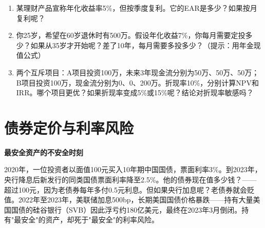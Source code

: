 \documentclass[a4paper,11pt]{ctexbook}
\begin{document}
\begin{exercises}
\begin{enumerate}
  \item 某理财产品宣称年化收益率5\%，但按季度复利。它的EAR是多少？如果按月复利呢？
  \item 你25岁，希望在60岁退休时有500万。假设年化收益7\%，你每月需要定投多少？如果从35岁才开始呢？差了10年，每月需要多投多少？（提示：用年金现值公式）
  \item 两个互斥项目：A项目投资100万，未来3年现金流分别为50万、50万、50万；B项目投资100万，现金流分别为0、0、200万。折现率10\%，分别计算NPV和IRR。哪个项目更优？如果折现率变成5\%或15\%呢？结论对折现率敏感吗？
\end{enumerate}
\end{exercises}


\newpage
\chapter{债券定价与利率风险}

\begin{scenario}
\textbf{最安全资产的不安全时刻}

2020年，一位投资者以面值100元买入10年期中国国债，票面利率3\%。到2023年，央行降息后新发行的同类国债票面利率降至2.5\%。他的债券现在值多少钱？——超过100元，因为老债券每年多付0.5元利息。但如果央行加息呢？老债券就会贬值。2022年至2023年，美联储加息500bp，长期美国国债价格暴跌——持有大量美国国债的硅谷银行（SVB）因此浮亏约180亿美元，最终在2023年3月倒闭。持有"最安全"的资产，却死于"最安全"的利率风险。
\end{scenario}
\end{document}
